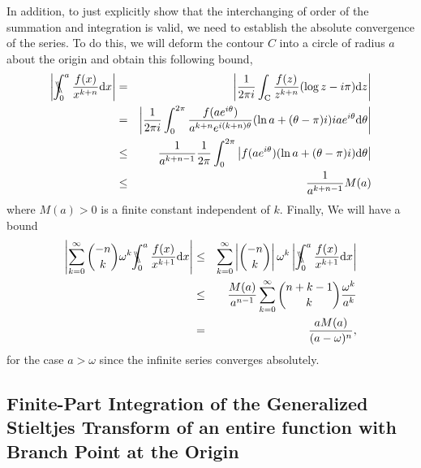 In addition, to just explicitly show that the interchanging of order of the summation and integration is valid, we need to establish the absolute convergence of the series. To do this, we will deform the contour $C$ into a circle of radius $a$ about the origin and obtain this following bound,
 \begin{eqnarray}
 \left|\bbint{0}{a} \frac{f(x)}{x^{k+n}}\mathrm{d}x\right| &=& \left|\frac{1}{2\pi i}\int_{\mathrm{C}} \frac{f(z)}{z^{k+n}} (\log z - i\pi) \mathrm{d}z\right|\nonumber \\
 &=& \left|\frac{1}{2\pi i} \int_0^{2\pi} \frac{f(a e^{i\theta})}{a^{k + n} e^{i(k+n)\theta}} (\ln a + (\theta - \pi)i) i a e^{i\theta} \mathrm{d}\theta\right|\nonumber \\
 &\leq & \frac{1}{a^{k+n - 1}} \frac{1}{2\pi} \int_0^{2\pi} \left|f(ae^{i\theta})(\ln a + (\theta - \pi)i)  \mathrm{d}\theta\right| \nonumber \\
 &\leq& \frac{1}{a^{k+n-1}} M(a)
 \end{eqnarray}
 where $M(a) > 0$ is a finite constant independent of $k$. Finally,  We will have a bound
\begin{eqnarray}\label{delta2}
\left|\sum_{k=0}^{\infty} \binom{-n}{k} \omega^{ k} \bbint{0}{a} \frac{f(x)}{x^{k  +1}}\mathrm{d}x\right|&\leq& \sum_{k=0}^{\infty} \left|\binom{-n}{k}\right| \omega^{k} \left|\bbint{0}{a} \frac{f(x)}{x^{k  +1}}\mathrm{d}x\right| \nonumber \\
&\leq& \frac{M(a)}{a^{n-1}}\sum_{k=0}^{\infty} \binom{n+k-1}{k} \frac{\omega^{ k}}{a^{k}} \nonumber \\
&=& \frac{a M(a)}{(a - \omega)^n},
\end{eqnarray}
 for the case $a>\omega$ since the infinite series converges absolutely.

 
\subsection{Finite-Part Integration of the Generalized Stieltjes Transform of an entire function with Branch Point at the Origin}

